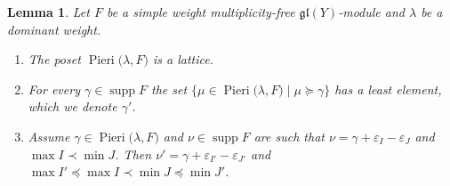 \documentclass[11pt,fleqn]{amsart}
\renewcommand\epsilon{\varepsilon}
\newtheorem{lem}[thm]{Lemma}
\theoremstyle{definition}
\theoremstyle{remark}
\theoremstyle{remark}
\newcommand\gl{\mathfrak{gl}}
\DeclareMathOperator\supp{supp}
\newcommand\Pieri[2]{\operatorname{Pieri}{(#1},{#2)}}
\begin{document}
\begin{lem}
\label{lem:pieri-lattice}
Let $F$ be a simple weight multiplicity-free $\gl(Y)$-module and $\lambda$ be a
dominant weight. 
\begin{enumerate}
  \item The poset $\Pieri{\lambda}{F}$ is a lattice.

  \item For every $\gamma \in \supp F$ the set $\{\mu \in \Pieri{\lambda}{F} 
    \mid \mu \succeq \gamma\}$ has a least element, which we denote $\gamma'$.

  \item Assume $\gamma \in \Pieri{\lambda}{F}$ and $\nu \in \supp F$ are such 
    that $\nu = \gamma + \epsilon_I - \epsilon_J$ and $\max I \prec \min J$. 
    Then $\nu' = \gamma + \epsilon_{I'} - \epsilon_{J'}$ and $\max I' \preceq 
    \max I \prec \min J \preceq \min J'$.
\end{enumerate}
\end{lem}
\end{document}
